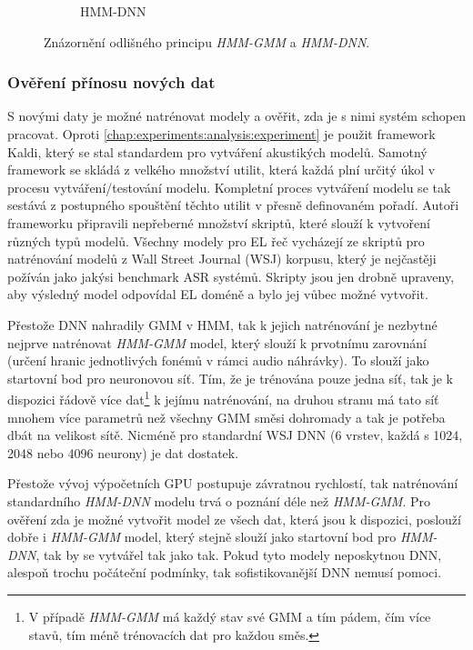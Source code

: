 \begin{figure}[htpb]
\begin{subfigure}[b]{0.4\textwidth}
    \caption{HMM-DNN}
    \label{fig:experiments:normalization:hmm:dnn}
  \end{subfigure}
  \caption{Znázornění odlišného principu \textit{HMM-GMM} a \textit{HMM-DNN}.}
  \label{fig:experiments:normalization:hmm}
\end{figure}

\subsubsection{Ověření přínosu nových dat}

S novými daty je možné natrénovat modely a ověřit, zda je s nimi systém schopen pracovat. Oproti \ref{chap:experiments:analysis:experiment} je použit framework Kaldi, který se stal standardem pro vytváření akustikých modelů. Samotný framework se skládá z velkého množství utilit, která každá plní určitý  úkol v procesu vytváření/testování modelu. Kompletní proces vytváření modelu se tak sestává z postupného spouštění těchto utilit v přesně definovaném pořadí. Autoři frameworku připravili nepřeberné množství skriptů, které slouží k vytvoření různých typů modelů. Všechny modely pro EL řeč vycházejí ze skriptů pro natrénování modelů z Wall Street Journal (WSJ) korpusu, který je nejčastěji požíván jako jakýsi benchmark ASR systémů. Skripty jsou jen drobně upraveny, aby výsledný model odpovídal EL doméně a bylo jej vůbec možné vytvořit.

Přestože DNN nahradily GMM v HMM, tak k jejich natrénování je nezbytné nejprve natrénovat \textit{HMM-GMM} model, který slouží k prvotnímu zarovnání (určení hranic jednotlivých fonémů v rámci audio náhrávky). To slouží jako startovní bod pro neuronovou síť. Tím, že je trénována pouze jedna síť, tak je k dispozici řádově více dat\footnote{V případě \textit{HMM-GMM} má každý stav své GMM a tím pádem, čím více stavů, tím méně trénovacích dat pro každou směs.} k jejímu natrénování, na druhou stranu má tato síť mnohem více parametrů než všechny GMM směsi dohromady a tak je potřeba dbát na velikost sítě. Nicméně pro standardní WSJ DNN (6 vrstev, každá s 1024, 2048 nebo 4096 neurony) je dat dostatek.

Přestože vývoj výpočetních GPU postupuje závratnou rychlostí, tak natrénování standardního \textit{HMM-DNN} modelu trvá o poznání déle než \textit{HMM-GMM}. Pro ověření zda je možné vytvořit model ze všech dat, která jsou k dispozici, poslouží dobře i \textit{HMM-GMM} model, který stejně slouží jako startovní bod pro \textit{HMM-DNN}, tak by se vytvářel tak jako tak. Pokud tyto modely neposkytnou DNN, alespoň trochu  počáteční podmínky, tak sofistikovanější DNN nemusí pomoci.

